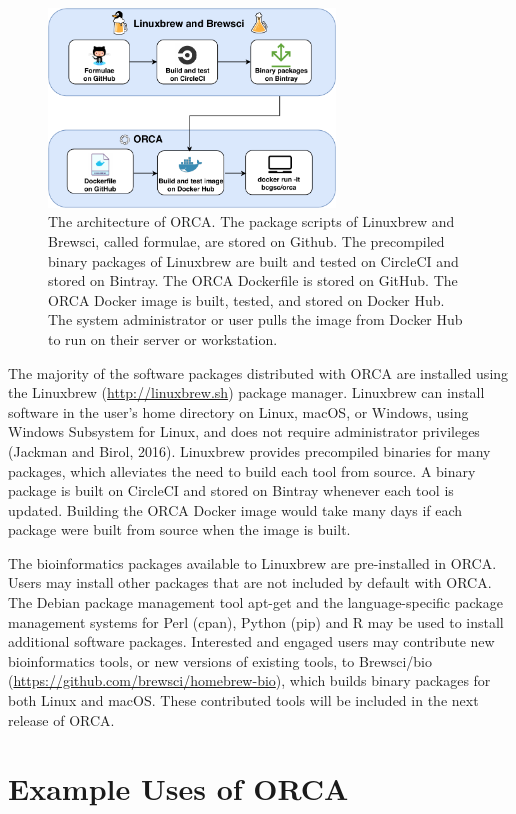 \documentclass{bioinfo}
\begin{document}
\begin{figure}
\centering
\includegraphics[width=3in]{figures/architecture.pdf}
\caption{The architecture of ORCA. The package scripts of Linuxbrew and Brewsci, called formulae, are stored on Github. The precompiled binary packages of Linuxbrew are built and tested on CircleCI and stored on Bintray. The ORCA Dockerfile is stored on GitHub. The ORCA Docker image is built, tested, and stored on Docker Hub. The system administrator or user pulls the image from Docker Hub to run on their server or workstation.}
\label{fig:orca}
\end{figure}

The majority of the software packages distributed with ORCA are installed using the Linuxbrew (\url{http://linuxbrew.sh}) package manager. Linuxbrew can install software in the user's home directory on Linux, macOS, or Windows, using Windows Subsystem for Linux, and does not require administrator privileges (Jackman and Birol, 2016). Linuxbrew provides precompiled binaries for many packages, which alleviates the need to build each tool from source. A binary package is built on CircleCI and stored on Bintray whenever each tool is updated. Building the ORCA Docker image would take many days if each package were built from source when the image is built.

The bioinformatics packages available to Linuxbrew are pre-installed in ORCA. Users may install other packages that are not included by default with ORCA. The Debian package management tool apt-get and the language-specific package management systems for Perl (cpan), Python (pip) and R may be used to install additional software packages. Interested and engaged users may contribute new bioinformatics tools, or new versions of existing tools, to Brewsci/bio (\url{https://github.com/brewsci/homebrew-bio}), which builds binary packages for both Linux and macOS. These contributed tools will be included in the next release of ORCA.

\section{Example Uses of ORCA}
\end{document}
